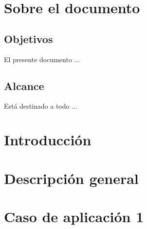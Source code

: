 \documentclass{GVT_CONAE_Class}
\begin{document}
\section{Sobre el documento}

    \subsection{Objetivos}
    El presente documento ...

    \subsection{Alcance}
    Está destinado a todo ...
    
    \printglossary[type=\acronymtype, numberedsection, title=Lista de acrónimos y abreviaturas]
\section{Introducción}


\section{Descripción general}


\section{Caso de aplicación 1}
\end{document}
